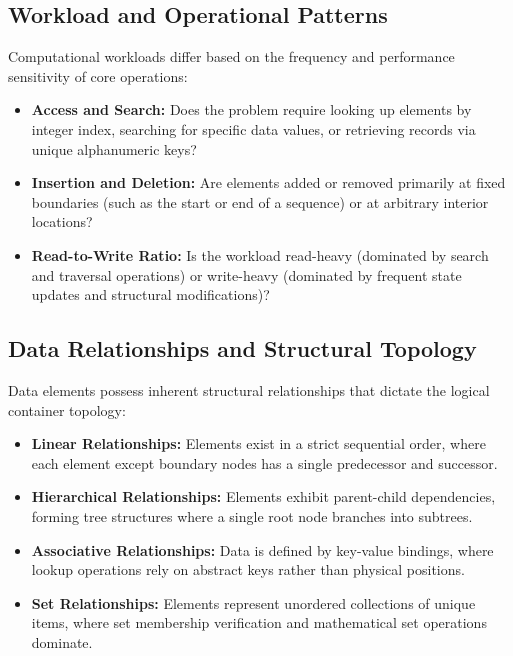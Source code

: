 \documentclass[12pt]{report}
\begin{document}
\subsection{Workload and Operational Patterns}
Computational workloads differ based on the frequency and performance sensitivity of core operations:
\begin{itemize}
    \item \textbf{Access and Search:} Does the problem require looking up elements by integer index, searching for specific data values, or retrieving records via unique alphanumeric keys?
    \item \textbf{Insertion and Deletion:} Are elements added or removed primarily at fixed boundaries (such as the start or end of a sequence) or at arbitrary interior locations?
    \item \textbf{Read-to-Write Ratio:} Is the workload read-heavy (dominated by search and traversal operations) or write-heavy (dominated by frequent state updates and structural modifications)?
\end{itemize}

\subsection{Data Relationships and Structural Topology}
Data elements possess inherent structural relationships that dictate the logical container topology:
\begin{itemize}
    \item \textbf{Linear Relationships:} Elements exist in a strict sequential order, where each element except boundary nodes has a single predecessor and successor.
    \item \textbf{Hierarchical Relationships:} Elements exhibit parent-child dependencies, forming tree structures where a single root node branches into subtrees.
    \item \textbf{Associative Relationships:} Data is defined by key-value bindings, where lookup operations rely on abstract keys rather than physical positions.
    \item \textbf{Set Relationships:} Elements represent unordered collections of unique items, where set membership verification and mathematical set operations dominate.
\end{itemize}
\end{document}
